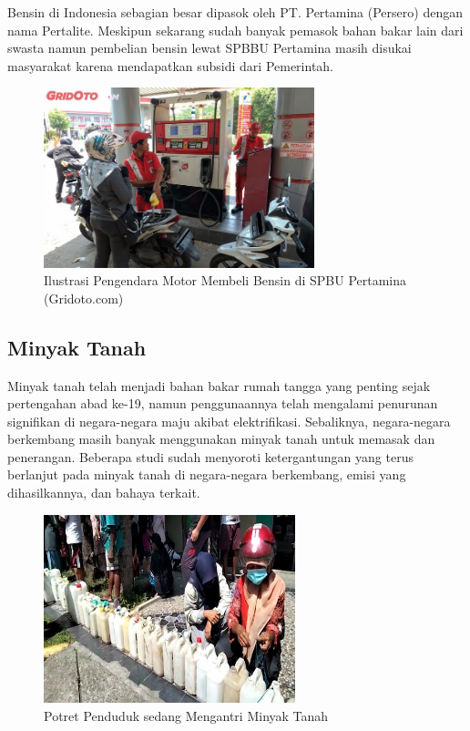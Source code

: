 Bensin di Indonesia sebagian besar dipasok oleh PT. Pertamina (Persero) dengan nama Pertalite. Meskipun sekarang sudah banyak pemasok bahan bakar lain dari swasta namun pembelian bensin lewat SPBBU Pertamina masih disukai masyarakat karena mendapatkan subsidi dari Pemerintah.

\begin{figure}[h!]
    \centering
    \includegraphics[width=0.7\textwidth]{gambar/isibensin.jpg}
    \caption{Ilustrasi Pengendara Motor Membeli Bensin di SPBU Pertamina (Gridoto.com)}
    \label{fig:ilus-isi-bensin}
\end{figure}

\subsection{Minyak Tanah}
\label{subsec:minyak-tanah-tp}

Minyak tanah telah menjadi bahan bakar rumah tangga yang penting sejak pertengahan abad ke-19, namun penggunaannya telah mengalami penurunan signifikan di negara-negara maju akibat elektrifikasi. Sebaliknya, negara-negara berkembang masih banyak menggunakan minyak tanah untuk memasak dan penerangan. Beberapa studi sudah menyoroti ketergantungan yang terus berlanjut pada minyak tanah di negara-negara berkembang, emisi yang dihasilkannya, dan bahaya terkait.

\begin{figure}[h!]
    \centering
    \includegraphics[width=0.65\textwidth]{gambar/Minyak-Berita-Maluku-Tengah-1-500x375.jpg}
    \caption{Potret Penduduk sedang Mengantri Minyak Tanah \citep{Radiodms_2021}}
    \label{fig:ilus-antri-minyak-tanah}
\end{figure}

